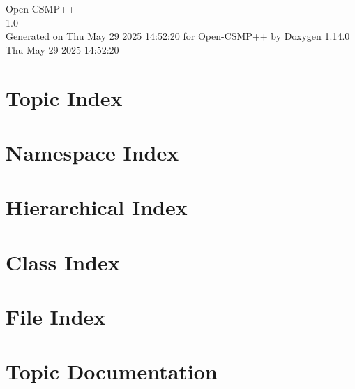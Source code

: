 \documentclass[twoside]{book}
\newcommand{\+}{\discretionary{\mbox{\scriptsize$\hookleftarrow$}}{}{}}
\newcommand{\clearemptydoublepage}{%
    \newpage{\pagestyle{empty}\cleardoublepage}%
  }
\begin{document}
  \raggedbottom
    \hypersetup{pageanchor=false,
                bookmarksnumbered=true,
                pdfencoding=unicode
               }
  \begin{titlepage}
  \vspace*{7cm}
  \begin{center}%
  {\Large Open-\/\+CSMP++}\\
  [1ex]\large 1.\+0 \\
  \vspace*{1cm}
  {\large Generated on Thu May 29 2025 14\+:52\+:20 for Open-\/\+CSMP++ by Doxygen 1.14.0}\\
    \vspace*{0.5cm}
    {\small Thu May 29 2025 14:52:20}
  \end{center}
  \end{titlepage}
  \clearemptydoublepage
  \tableofcontents
  \clearemptydoublepage
  \hypersetup{pageanchor=true}




\chapter{Topic Index}

\chapter{Namespace Index}

\chapter{Hierarchical Index}

\chapter{Class Index}

\chapter{File Index}

\chapter{Topic Documentation}







\end{document}
